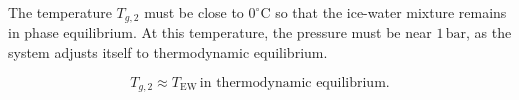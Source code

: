 The temperature \( T_{g,2} \) must be close to \( 0^\circ\text{C} \) so that the ice-water mixture remains in phase equilibrium. At this temperature, the pressure must be near \( 1 \, \text{bar} \), as the system adjusts itself to thermodynamic equilibrium.  

\[
T_{g,2} \approx T_{\text{EW}} \, \text{in thermodynamic equilibrium}.
\]